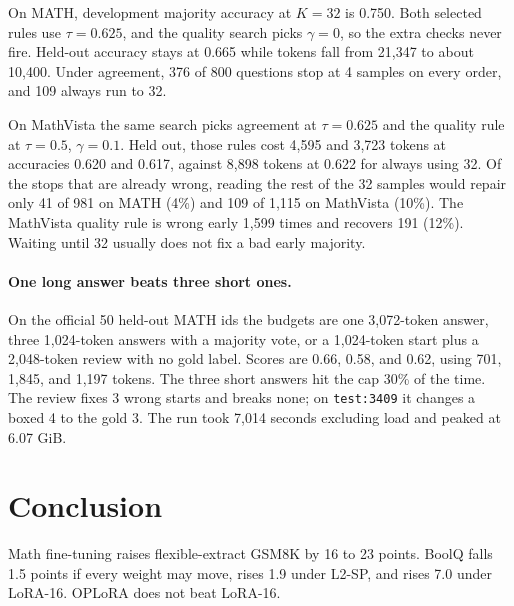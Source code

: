 \documentclass[10pt]{article}
\begin{document}
On MATH, development majority accuracy at $K=32$ is 0.750.
Both selected rules use $\tau=0.625$, and the quality search picks $\gamma=0$, so the extra checks never fire.
Held-out accuracy stays at 0.665 while tokens fall from 21{,}347 to about 10{,}400.
Under agreement, 376 of 800 questions stop at 4 samples on every order, and 109 always run to 32.

On MathVista the same search picks agreement at $\tau=0.625$ and the quality rule at $\tau=0.5$, $\gamma=0.1$.
Held out, those rules cost 4{,}595 and 3{,}723 tokens at accuracies 0.620 and 0.617, against 8{,}898 tokens at 0.622 for always using 32.
Of the stops that are already wrong, reading the rest of the 32 samples would repair only 41 of 981 on MATH (4\%) and 109 of 1{,}115 on MathVista (10\%).
The MathVista quality rule is wrong early 1{,}599 times and recovers 191 (12\%).
Waiting until 32 usually does not fix a bad early majority.

\paragraph{One long answer beats three short ones.}
On the official 50 held-out MATH ids the budgets are one 3{,}072-token answer, three 1{,}024-token answers with a majority vote, or a 1{,}024-token start plus a 2{,}048-token review with no gold label.
Scores are 0.66, 0.58, and 0.62, using 701, 1{,}845, and 1{,}197 tokens.
The three short answers hit the cap 30\% of the time.
The review fixes 3 wrong starts and breaks none; on \texttt{test:3409} it changes a boxed 4 to the gold 3.
The run took 7{,}014 seconds excluding load and peaked at 6.07 GiB.

\section{Conclusion}
Math fine-tuning raises flexible-extract GSM8K by 16 to 23 points.
BoolQ falls 1.5 points if every weight may move, rises 1.9 under L2-SP, and rises 7.0 under LoRA-16.
OPLoRA does not beat LoRA-16.
\end{document}
